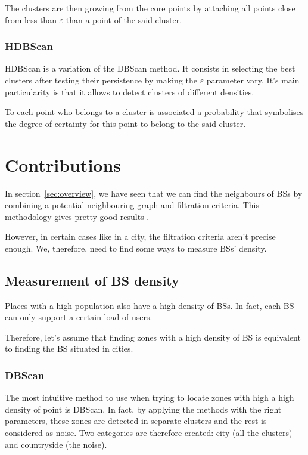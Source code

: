 \documentclass[lettersize,journal,english]{IEEEtran}
\begin{document}
            The clusters are then \og growing\fg{} from the core points by attaching all points close from less than $\varepsilon$ than a point of the said cluster.

        \subsubsection{HDBScan}
            HDBScan \cite{10.1007/978-3-642-37456-2_14} is a variation of the DBScan method.
            It consists in selecting the best clusters after testing their persistence by making the $\varepsilon$ parameter vary. It's main particularity is that it allows to detect clusters of different densities.

            To each point who belongs to a cluster is associated a probability that symbolises the degree of certainty for this point to belong to the said cluster.

\section{Contributions\label{sec:contrib}}
    \noindent In section~\ref{sec:overview}, we have seen that we can find the neighbours of BSs by combining a potential neighbouring graph and filtration criteria. This methodology gives pretty good results \cite{art_del_paq}.

    However, in certain cases like in a city, the filtration criteria aren't precise enough. We, therefore, need to find some ways to measure BSs' density.

    \subsection{Measurement of BS density}
        Places with a high population also have a high density of BSs. In fact, each BS can only support a certain load of users.

        Therefore, let's assume that finding zones with a high density of BS is equivalent to finding the BS situated in \og cities\fg{}.

        \subsubsection{DBScan}
            The most intuitive method to use when trying to locate zones with high a high density of point is DBScan. In fact, by applying the methods with the right parameters, these zones are detected in separate clusters and the rest is considered as noise. Two categories are therefore created: city (all the clusters) and countryside (the noise).
\end{document}
